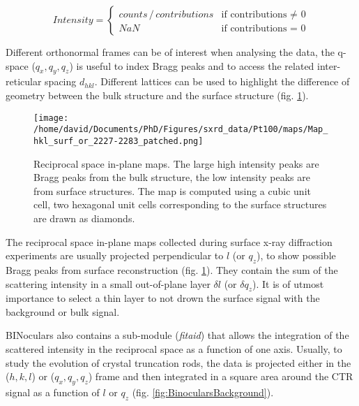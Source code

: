 \begin{equation}
    \label{eq:BinocularsIntensity}
    Intensity =
        \begin{cases}
            counts \, /  \,contributions  & \text{if contributions $\neq$ 0} \\
            NaN & \text{if contributions = 0}
        \end{cases}
\end{equation}

Different orthonormal frames can be of interest when analysing the data, the q-space ($q_x, q_y, q_z$) is useful to index Bragg peaks and to access the related inter-reticular spacing $d_{hkl}$.
Different lattices can be used to highlight the difference of geometry between the bulk structure and the surface structure (fig. \ref{fig:MapExampleBinoculars}).

\begin{figure}[!htb]
    \centering
    \texttt{[image: /home/david/Documents/PhD/Figures/sxrd\_data/Pt100/maps/Map\_hkl\_surf\_or\_2227-2283\_patched.png]}
    \caption{
    Reciprocal space in-plane maps.
    The large high intensity peaks are Bragg peaks from the bulk structure, the low intensity peaks are from surface structures.
    The map is computed using a cubic unit cell, two hexagonal unit cells corresponding to the surface structures are drawn as diamonds.
    }
    \label{fig:MapExampleBinoculars}
\end{figure}

The reciprocal space in-plane maps collected during surface x-ray diffraction experiments are usually projected perpendicular to $l$ (or $q_z$), to show possible Bragg peaks from surface reconstruction (fig. \ref{fig:MapExampleBinoculars}).
They contain the sum of the scattering intensity in a small out-of-plane layer $\delta l$ (or $\delta q_z$).
It is of utmost importance to select a thin layer to not drown the surface signal with the background or bulk signal.

BINoculars also contains a sub-module (\textit{fitaid}) that allows the integration of the scattered intensity in the reciprocal space as a function of one axis.
Usually, to study the evolution of crystal truncation rods, the data is projected either in the ($h, k, l$) or ($q_x, q_y, q_z$) frame and then integrated in a square area around the CTR signal as a function of $l$ or $q_z$ (fig. \ref{fig:BinocularsBackground}).


